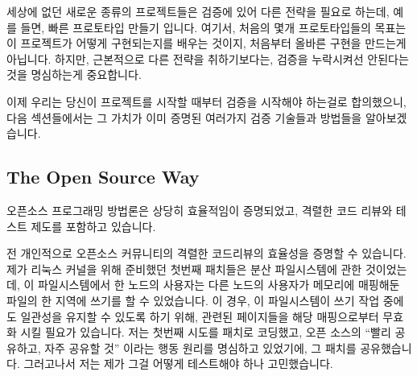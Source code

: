 세상에 없던 새로운 종류의 프로젝트들은 검증에 있어 다른 전략을 필요로 하는데,
예를 들면, 빠른 프로토타입 만들기 입니다.
여기서, 처음의 몇개 프로토타입들의 목표는 이 프로젝트가 어떻게 구현되는지를
배우는 것이지, 처음부터 올바른 구현을 만드는게 아닙니다.
하지만, 근본적으로 다른 전략을 취하기보다는, 검증을 누락시켜선 안된다는 것을
명심하는게 중요합니다.

이제 우리는 당신이 프로젝트를 시작할 때부터 검증을 시작해야 하는걸로
합의했으니, 다음 섹션들에서는 그 가치가 이미 증명된 여러가지 검증 기술들과
방법들을 알아보겠습니다.

\subsection{The Open Source Way}
\label{sec:debugging:The Open Source Way}

오픈소스 프로그래밍 방법론은 상당히 효율적임이 증명되었고, 격렬한 코드 리뷰와
테스트 제도를 포함하고 있습니다.

전 개인적으로 오픈소스 커뮤니티의 격렬한 코드리뷰의 효율성을 증명할 수
있습니다.
제가 리눅스 커널을 위해 준비했던 첫번째 패치들은 분산 파일시스템에 관한
것이었는데, 이 파일시스템에서 한 노드의 사용자는 다른 노드의 사용자가 메모리에
매핑해둔 파일의 한 지역에 쓰기를 할 수 있었습니다.
이 경우, 이 파일시스템이 쓰기 작업 중에도 일관성을 유지할 수 있도록 하기 위해,
관련된 페이지들을 해당 매핑으로부터 무효화 시킬 필요가 있습니다.
저는 첫번째 시도를 패치로 코딩했고, 오픈 소스의 ``빨리 공유하고, 자주 공유할
것'' 이라는 행동 원리를 명심하고 있었기에, 그 패치를 공유했습니다.
그러고나서 저는 제가 그걸 어떻게 테스트해야 하나 고민했습니다.

